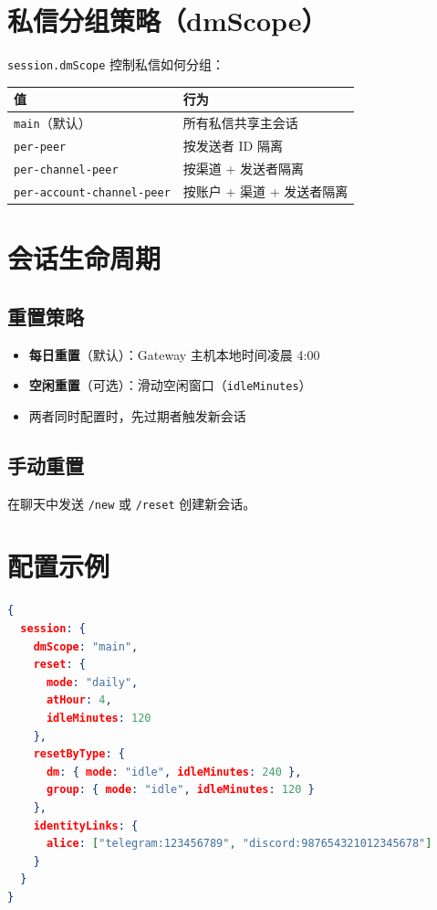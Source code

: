 \section{私信分组策略（dmScope）}

\texttt{session.dmScope} 控制私信如何分组：

\begin{center}
\begin{tabular}{ll}
\toprule
\textbf{值} & \textbf{行为} \\
\midrule
\texttt{main}（默认） & 所有私信共享主会话 \\
\texttt{per-peer} & 按发送者 ID 隔离 \\
\texttt{per-channel-peer} & 按渠道 + 发送者隔离 \\
\texttt{per-account-channel-peer} & 按账户 + 渠道 + 发送者隔离 \\
\bottomrule
\end{tabular}
\end{center}

\section{会话生命周期}

\subsection{重置策略}

\begin{itemize}
  \item \textbf{每日重置}（默认）：Gateway 主机本地时间凌晨 4:00
  \item \textbf{空闲重置}（可选）：滑动空闲窗口（\texttt{idleMinutes}）
  \item 两者同时配置时，先过期者触发新会话
\end{itemize}

\subsection{手动重置}

在聊天中发送 \texttt{/new} 或 \texttt{/reset} 创建新会话。

\section{配置示例}

\begin{lstlisting}[language=json]
{
  session: {
    dmScope: "main",
    reset: {
      mode: "daily",
      atHour: 4,
      idleMinutes: 120
    },
    resetByType: {
      dm: { mode: "idle", idleMinutes: 240 },
      group: { mode: "idle", idleMinutes: 120 }
    },
    identityLinks: {
      alice: ["telegram:123456789", "discord:987654321012345678"]
    }
  }
}
\end{lstlisting}

